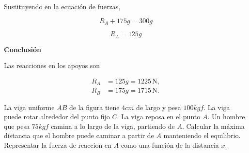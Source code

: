 \documentclass[12pt,a4paper]{article}
\begin{document}
\begin{solucion}
        Sustituyendo en la ecuación de fuerzas,

        \begin{equation*}
            R_A + 175g = 300g
        \end{equation*}

        \begin{equation*}
            R_A = 125g
        \end{equation*}

        \textbf{Conclusión}

        Las reacciones en los apoyos son

        \begin{align*}
            R_A &= 125g = 1225\,\text{N}, \\
            R_B &= 175g = 1715\,\text{N}.
        \end{align*}
    \end{solucion}

    \begin{mdframed}[style=mdbluebox,frametitle={Ejercicio 2}]
        La viga uniforme $AB$ de la figura tiene $4cm$ de largo y pesa $100kgf$. La viga puede
        rotar alrededor del punto fijo $C$. La viga reposa en el punto $A$. Un hombre que pesa
        $75kgf$ camina a lo largo de la viga, partiendo de $A$. Calcular la máxima distancia que
        el hombre puede caminar a partir de $A$ manteniendo el equilibrio. Representar
        la fuerza de reaccion en $A$ como una función de la distancia $x$.
    \end{mdframed}
\end{document}
